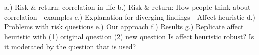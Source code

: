 \documentclass[a4paper,man, natbib,floatsintext]{apa6} %
\begin{document}










\section{}


a.)	Risk & return: correlation in life
b.)	Risk & return: How people think about correlation
-	examples
c.)	Explanation for diverging findings
-	Affect heuristic
d.)	Problems with risk questions
e.)	Our approach
f.)	Results
g.)	Replicate affect heuristic with (1) original question (2) new question
	Is affect heuristic robust?
	Is it moderated by the question that is used?
\end{document}
